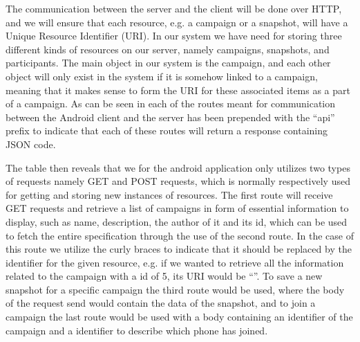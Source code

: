 The communication between the server and the client will be done over HTTP, and we will ensure that each resource, e.g. a campaign or a snapshot, will have a Unique Resource Identifier (URI). In our system we have need for storing three different kinds of resources on our server, namely campaigns, snapshots, and participants. The main object in our system is the campaign, and each other object will only exist in the system if it is somehow linked to a campaign, meaning that it makes sense to form the URI for these associated items as a part of a campaign. As can be seen in  each of the routes meant for communication between the Android client and the server has been prepended with the ``api'' prefix to indicate that each of these routes will return a response containing JSON code. 


The table then reveals that we for the android application only utilizes two types of requests namely GET and POST requests, which is normally respectively used for getting and storing new instances of resources. The first route will receive GET requests and retrieve a list of campaigns in form of essential information to display, such as name, description, the author of it and its id, which can be used to fetch the entire specification through the use of the second route. In the case of this route we utilize the curly braces to indicate that it should be replaced by the identifier for the given resource, e.g. if we wanted to retrieve all the information related to the campaign with a id of 5, its URI would be ``''. To save a new snapshot for a specific campaign the third route would be used, where the body of the request send would contain the data of the snapshot, and to join a campaign the last route would be used with a body containing an identifier of the campaign and a identifier to describe which phone has joined.


